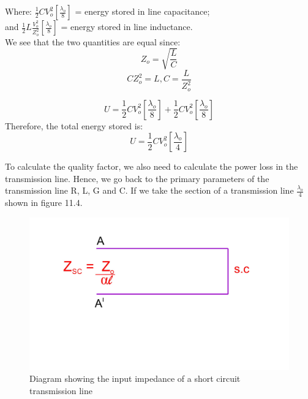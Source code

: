 Where: $\frac{1}{2}CV_{o}^{2}\left[\frac{\lambda_{o}}{8}\right] $ = energy stored in line capacitance;\\
and  $ \frac{1}{2}L\frac{V_{o}^{2}}{Z_{o}^{2}}\left[ \frac{\lambda_{o}}{8} \right] $ = energy stored in line inductance.\\
We see that the two quantities are equal since:
\begin{equation*}
Z_{o} = \sqrt{\frac{L}{C}}
\end{equation*}
\begin{equation*}
CZ_{o}^{2} = L,
C= {\frac{L}{Z_{o}^{2}}}
\end{equation*}

\begin{equation}
U= \frac{1}{2}CV_{o}^{2}\left[\frac{\lambda_{o}}{8}\right] +\frac{1}{2}CV_{o}^{2}\left[\frac{\lambda_{o}}{8}\right]
\end{equation}
Therefore, the total energy stored is:
\begin{equation}
U= \frac{1}{2}CV_{o}^{2}\left[\frac{\lambda_{o}}{4}\right] 
\end{equation}

To calculate the quality factor, we also need to calculate the power loss in the transmission line. Hence, we go back to the primary parameters of the transmission line R, L, G and C. If we take the section of a transmission line $\frac{\lambda_{o}}{4}$ shown in figure 11.4.
\begin{figure}[h]
\centering
\includegraphics[width=1\linewidth]{./graphics/fig4}
\caption{Diagram showing the input impedance of a short circuit transmission line}
\end{figure}

